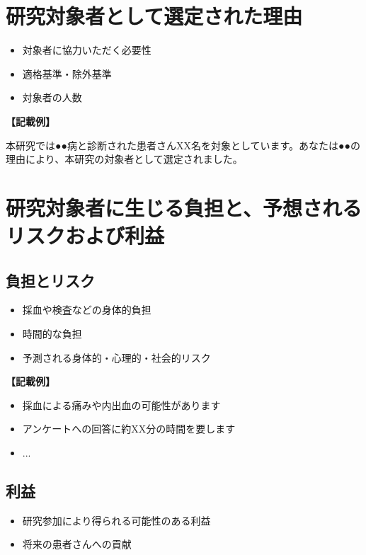 \documentclass[a4paper,11pt,lualatex,ja=standard]{bxjsarticle}
\begin{document}
\section{研究対象者として選定された理由}

\begin{itemize}
\item 対象者に協力いただく必要性
\item 適格基準・除外基準
\item 対象者の人数
\end{itemize}

\textbf{【記載例】}

本研究では●●病と診断された患者さんXX名を対象としています。あなたは●●の理由により、本研究の対象者として選定されました。

\section{研究対象者に生じる負担と、予想されるリスクおよび利益}

\subsection{負担とリスク}

\begin{itemize}
\item 採血や検査などの身体的負担
\item 時間的な負担
\item 予測される身体的・心理的・社会的リスク
\end{itemize}

\textbf{【記載例】}

\begin{itemize}
\item 採血による痛みや内出血の可能性があります
\item アンケートへの回答に約XX分の時間を要します
\item ...
\end{itemize}

\subsection{利益}

\begin{itemize}
\item 研究参加により得られる可能性のある利益
\item 将来の患者さんへの貢献
\end{itemize}
\end{document}
